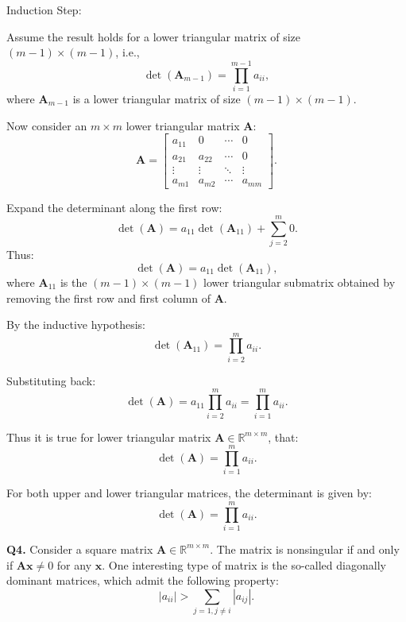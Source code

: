 \documentclass[12pt]{article}
\newcommand{\bvec}[1]{\mathbf{#1}} %
\newcommand{\bmat}[1]{\mathbf{#1}} %
\begin{document}
    Induction Step:
        
   Assume the result holds for a lower triangular matrix of size \( (m-1) \times (m-1) \), i.e.,
    \[
    \det(\mathbf{A}_{m-1}) = \prod_{i=1}^{m-1} a_{ii},
    \]
    where \( \mathbf{A}_{m-1} \) is a lower triangular matrix of size \( (m-1) \times (m-1) \).
    
    Now consider an \( m \times m \) lower triangular matrix \( \mathbf{A} \):
    \[
    \mathbf{A} = 
    \begin{bmatrix}
    a_{11} & 0 & \cdots & 0 \\
    a_{21} & a_{22} & \cdots & 0 \\
    \vdots & \vdots & \ddots & \vdots \\
    a_{m1} & a_{m2} & \cdots & a_{mm}
    \end{bmatrix}.
    \]
    
    Expand the determinant along the first row:
    \[
    \det(\mathbf{A}) = a_{11} \det(\mathbf{A}_{11}) + \sum_{j=2}^m 0.
    \]
    Thus:
    \[
    \det(\mathbf{A}) = a_{11} \det(\mathbf{A}_{11}),
    \]
    where \( \mathbf{A}_{11} \) is the \((m-1) \times (m-1)\) lower triangular submatrix obtained by removing the first row and first column of \( \mathbf{A} \).
    
    By the inductive hypothesis:
    \[
    \det(\mathbf{A}_{11}) = \prod_{i=2}^m a_{ii}.
    \]
    
    Substituting back:
    \[
    \det(\mathbf{A}) = a_{11} \prod_{i=2}^m a_{ii} = \prod_{i=1}^m a_{ii}.
    \]
    
    Thus it is true for lower triangular matrix
    \( \bmat{A} \in \mathbb{R}^{m \times m} \), that:
    \[
    \det(\bmat{A}) = \prod_{i=1}^m a_{ii}.
    \] 

\vspace{\baselineskip}

For both upper and lower triangular matrices, the determinant is given by:
\[
\det(\mathbf{A}) = \prod_{i=1}^m a_{ii}.
\]

\vspace{\baselineskip}
\hline
\vspace{\baselineskip}

\textbf{Q4.} Consider a square matrix \( \bmat{A} \in \mathbb{R}^{m \times m} \). The matrix is nonsingular if and only if \( \bmat{A} \bvec{x} \neq 0 \) for any \( \bvec{x} \). One interesting type of matrix is the so-called diagonally dominant matrices, which admit the following property:
\[
|a_{ii}| > \sum_{j=1, j \neq i} |a_{ij}|.
\]
\end{document}

